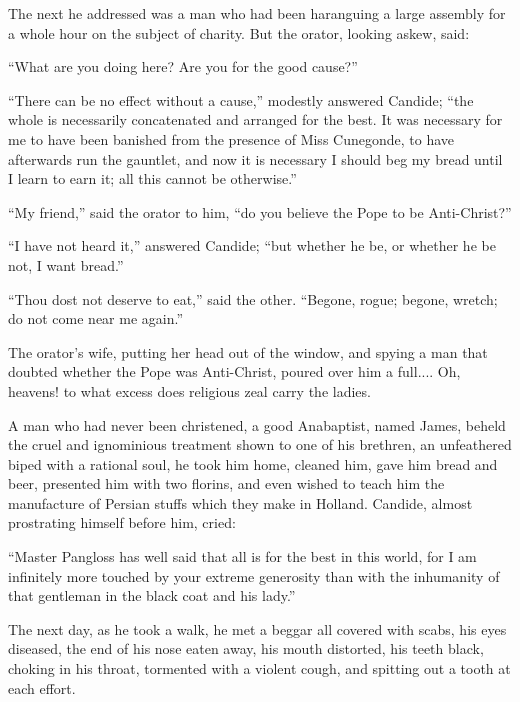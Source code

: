 The next he addressed was a man who had been haranguing a large assembly for a whole hour on the subject of charity. But the orator, looking askew, said:

``What are you doing here? Are you for the good cause?''

``There can be no effect without a cause,'' modestly answered Candide; ``the whole is necessarily concatenated and arranged for the best. It was necessary for me to have been banished from the presence of Miss Cunegonde, to have afterwards run the gauntlet, and now it is necessary I should beg my bread until I learn to earn it; all this cannot be otherwise.''

``My friend,'' said the orator to him, ``do you believe the Pope to be Anti-Christ?''

``I have not heard it,'' answered Candide; ``but whether he be, or whether he be not, I want bread.''

``Thou dost not deserve to eat,'' said the other. ``Begone, rogue; begone, wretch; do not come near me again.''

The orator's wife, putting her head out of the window, and spying a man that doubted whether the Pope was Anti-Christ, poured over him a full.... Oh, heavens! to what excess does religious zeal carry the ladies.

A man who had never been christened, a good Anabaptist, named James, beheld the cruel and ignominious treatment shown to one of his brethren, an unfeathered biped with a rational soul, he took him home, cleaned him, gave him bread and beer, presented him with two florins, and even wished to teach him the manufacture of Persian stuffs which they make in Holland. Candide, almost prostrating himself before him, cried:

``Master Pangloss has well said that all is for the best in this world, for I am infinitely more touched by your extreme generosity than with the inhumanity of that gentleman in the black coat and his lady.''

The next day, as he took a walk, he met a beggar all covered with scabs, his eyes diseased, the end of his nose eaten away, his mouth distorted, his teeth black, choking in his throat, tormented with a violent cough, and spitting out a tooth at each effort.

